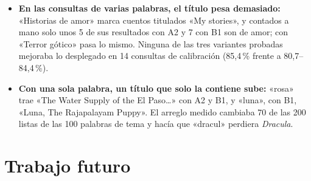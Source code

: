 \documentclass[11pt,a4paper]{article}
\begin{document}
\begin{enumerate}[leftmargin=*, itemsep=4pt]
\begin{itemize}
                atrás). Con título y autor no pasa: «Crimen y castigo de Dostoyevski» da 0.
          \item \textbf{En las consultas de varias palabras, el título pesa demasiado:}
                «Historias de amor» marca cuentos titulados «My stories», y contados a mano
                solo unos 5 de sus resultados con A2 y 7 con B1 son de amor; con «Terror
                gótico» pasa lo mismo. Ninguna de las tres variantes probadas mejoraba lo
                desplegado en 14 consultas de calibración (85,4\,\% frente a
                80,7--84,4\,\%).
          \item \textbf{Con una sola palabra, un título que solo la contiene sube:}
                «rosa» trae «The Water Supply of the El Paso…» con A2 y B1, y «luna», con
                B1, «Luna, The Rajapalayam Puppy». El arreglo medido cambiaba 70 de las 200
                listas de las 100 palabras de tema y hacía que «dracul» perdiera
                \emph{Dracula}.
        \end{itemize}
\end{enumerate}

\section{Trabajo futuro}
\end{document}
